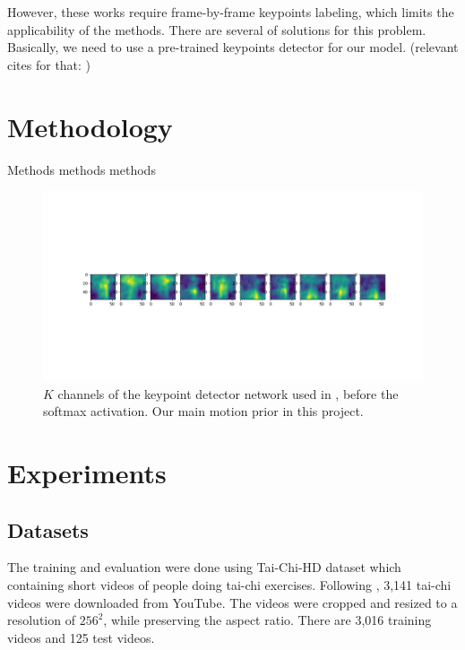 \documentclass{article}
\begin{document}
 However, these works require frame-by-frame keypoints labeling, which limits the applicability of the methods. There are several of solutions for this problem. Basically, we need to use a pre-trained keypoints detector for our model. (relevant cites for that: )
\section{Methodology}
Methods
methods
methods
\label{method}
\begin{figure}[ht]
\vskip 0.2in
\begin{center}
\centerline{\includegraphics[width=\columnwidth]{mask_10kp}}
\caption{
$K$ channels of the keypoint detector network used in
\cite{siarohin2020order}, before the softmax activation. Our main motion
prior in this project.
}
\label{mask-10kp}
\end{center}
\vskip -0.2in
\end{figure}
\section{Experiments}
\subsection{Datasets}
The training and evaluation were done using Tai-Chi-HD dataset which containing short videos of people doing tai-chi exercises. Following \cite{siarohin2020order}, 3,141 tai-chi videos were downloaded from YouTube. The videos were cropped and resized to a resolution of $256^2$, while preserving the aspect ratio. There are 3,016 training videos and 125 test videos.
\end{document}

